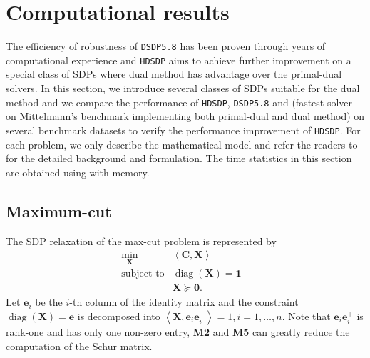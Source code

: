 \section{Computational results}

The efficiency of robustness of {{\texttt{DSDP5.8}}} has been proven through
years of computational experience and {{\texttt{HDSDP}}} aims to achieve
further improvement on a special class of SDPs where dual method has
advantage over the primal-dual solvers. In this section, we introduce several
classes of SDPs suitable for the dual method and we compare the performance
of {{\texttt{HDSDP}}}, {{\texttt{DSDP5.8}}} and  (fastest solver on Mittelmann's benchmark implementing both primal-dual and dual method) on
several benchmark datasets to verify the performance improvement of
{{\texttt{HDSDP}}}. For each problem, we only describe the mathematical model
and refer the readers to
{\cite{mittelmann2003independent,borchers1999sdplib}} for the detailed
background and formulation. The time statistics in this section are obtained
using  with
 memory.

\subsection{Maximum-cut}

The SDP relaxation of the max-cut problem is represented by
\begin{eqnarray*}
  \min_{\mathbf{X}} & \left\langle \mathbf{C}, \mathbf{X} \right\rangle & \\
  \text{subject to} & \ensuremath{\operatorname{diag}} \left( \mathbf{X} \right) = \textbf{1} & \\
  & \mathbf{X} \succeq \textbf{0} . & 
\end{eqnarray*}
Let $\mathbf{e}_i$ be the $i$-th column of the identity matrix and the constraint
$\ensuremath{\operatorname{diag}} \left( \mathbf{X} \right) = \mathbf{e}$ is decomposed into $\left\langle \mathbf{X}, \mathbf{e}_i
\mathbf{e}_i^{\top} \right\rangle = 1, i = 1, \ldots, n$. Note that $\mathbf{e}_i \mathbf{e}_i^{\top}$
is rank-one and has only one non-zero entry, {\textbf{M2}} and
{\textbf{M5}} can greatly reduce the computation of the Schur matrix.

